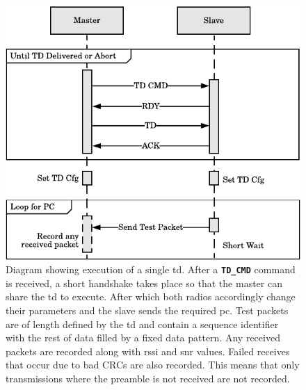 \begin{figure}[p]
    \centering
    \includegraphics{Figures/software_testdef_execution}
    \caption[Master-Slave test definition execution method]{
    	Diagram showing execution of a single \ac{td}. After a \textbf{\texttt{TD\_CMD}} command is received, a short handshake takes place so that the master can share the \ac{td} to execute. After which both radios accordingly change their parameters and the slave sends the required \ac{pc}. Test packets are of length defined by the \ac{td} and contain a sequence identifier with the rest of data filled by a fixed data pattern. Any received packets are recorded along with \ac{rssi} and \ac{snr} values. Failed receives that occur due to bad CRCs are also recorded. This means that only transmissions where the preamble is not received are not recorded.
    }
    \label{fig:software_testdef_execution}
\end{figure}